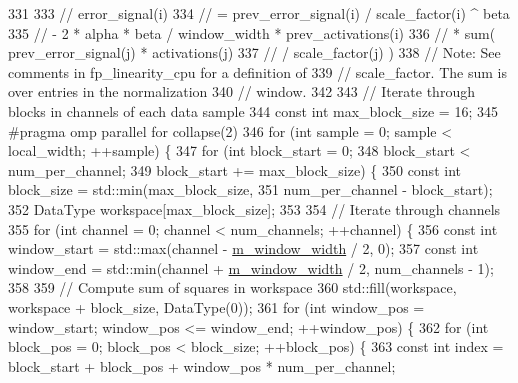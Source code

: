 \begin{DoxyCode}
331 
333     \textcolor{comment}{// error\_signal(i)}
334     \textcolor{comment}{//   = prev\_error\_signal(i) / scale\_factor(i) ^ beta}
335     \textcolor{comment}{//     - 2 * alpha * beta / window\_width * prev\_activations(i)}
336     \textcolor{comment}{//       * sum( prev\_error\_signal(j) * activations(j)}
337     \textcolor{comment}{//              / scale\_factor(j) )}
338     \textcolor{comment}{// Note: See comments in fp\_linearity\_cpu for a definition of}
339     \textcolor{comment}{//   scale\_factor. The sum is over entries in the normalization}
340     \textcolor{comment}{//   window.}
342 \textcolor{comment}{}
343     \textcolor{comment}{// Iterate through blocks in channels of each data sample}
344     \textcolor{keyword}{const} \textcolor{keywordtype}{int} max\_block\_size = 16;
345 \textcolor{preprocessor}{    #pragma omp parallel for collapse(2)}
346     \textcolor{keywordflow}{for} (\textcolor{keywordtype}{int} sample = 0; sample < local\_width; ++sample) \{
347       \textcolor{keywordflow}{for} (\textcolor{keywordtype}{int} block\_start = 0;
348           block\_start < num\_per\_channel;
349           block\_start += max\_block\_size) \{
350         \textcolor{keyword}{const} \textcolor{keywordtype}{int} block\_size = std::min(max\_block\_size,
351                                         num\_per\_channel - block\_start);
352         DataType workspace[max\_block\_size];
353 
354         \textcolor{comment}{// Iterate through channels}
355         \textcolor{keywordflow}{for} (\textcolor{keywordtype}{int} channel = 0; channel < num\_channels; ++channel) \{
356           \textcolor{keyword}{const} \textcolor{keywordtype}{int} window\_start = std::max(channel - \hyperlink{classlbann_1_1local__response__normalization__layer_a4914619a19eb43efcf8240b8a1e0c090}{m\_window\_width} / 2, 0);
357           \textcolor{keyword}{const} \textcolor{keywordtype}{int} window\_end = std::min(channel + \hyperlink{classlbann_1_1local__response__normalization__layer_a4914619a19eb43efcf8240b8a1e0c090}{m\_window\_width} / 2, num\_channels - 1);
358 
359           \textcolor{comment}{// Compute sum of squares in workspace}
360           std::fill(workspace, workspace + block\_size, DataType(0));
361           \textcolor{keywordflow}{for} (\textcolor{keywordtype}{int} window\_pos = window\_start; window\_pos <= window\_end; ++window\_pos) \{
362             \textcolor{keywordflow}{for} (\textcolor{keywordtype}{int} block\_pos = 0; block\_pos < block\_size; ++block\_pos) \{
363               \textcolor{keyword}{const} \textcolor{keywordtype}{int} index = block\_start + block\_pos + window\_pos * num\_per\_channel;

\end{DoxyCode}
